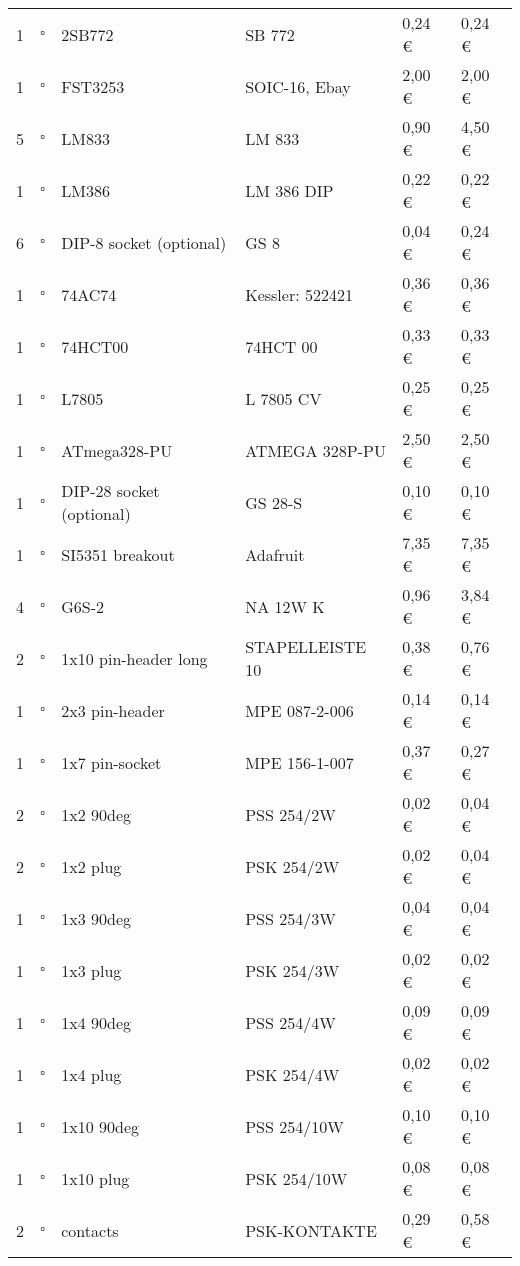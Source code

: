 \begin{longtable}{|p{}|p{}|p{}|p{}|p{}|p{}|}
1 & $\square$ & 2SB772 & SB 772 & 0,24 \euro & 0,24 \euro \\
1 & $\square$ & FST3253 & SOIC-16, Ebay & 2,00 \euro & 2,00 \euro \\
5 & $\square$ & LM833 & LM 833 & 0,90 \euro & 4,50 \euro \\
1 & $\square$ & LM386 & LM 386 DIP & 0,22 \euro & 0,22 \euro \\
6 & $\square$ & DIP-8 socket (optional) & GS 8 & 0,04 \euro & 0,24 \euro \\
1 & $\square$ & 74AC74 & Kessler: 522421 & 0,36 \euro & 0,36 \euro \\
1 & $\square$ & 74HCT00 & 74HCT 00 & 0,33 \euro & 0,33 \euro \\
1 & $\square$ & L7805 & L 7805 CV & 0,25 \euro & 0,25 \euro \\
1 & $\square$ & ATmega328-PU & ATMEGA 328P-PU & 2,50 \euro & 2,50 \euro \\
1 & $\square$ & DIP-28 socket (optional) & GS 28-S & 0,10 \euro & 0,10 \euro \\
1 & $\square$ & SI5351 breakout & Adafruit & 7,35 \euro & 7,35 \euro \\ \hline
4 & $\square$ & G6S-2 & NA 12W K & 0,96 \euro & 3,84 \euro \\ \hline
2 & $\square$ & 1x10 pin-header long & STAPELLEISTE 10 & 0,38 \euro & 0,76 \euro \\
1 & $\square$ & 2x3 pin-header & MPE 087-2-006 & 0,14 \euro & 0,14 \euro \\
1 & $\square$ & 1x7 pin-socket & MPE 156-1-007 & 0,37 \euro & 0,27 \euro \\
2 & $\square$ & 1x2 90deg & PSS 254/2W & 0,02 \euro & 0,04 \euro \\
2 & $\square$ & 1x2 plug & PSK 254/2W & 0,02 \euro & 0,04 \euro \\
1 & $\square$ & 1x3 90deg & PSS 254/3W & 0,04 \euro & 0,04 \euro \\
1 & $\square$ & 1x3 plug & PSK 254/3W & 0,02 \euro & 0,02 \euro \\
1 & $\square$ & 1x4 90deg & PSS 254/4W & 0,09 \euro & 0,09 \euro \\
1 & $\square$ & 1x4 plug & PSK 254/4W & 0,02 \euro & 0,02 \euro \\
1 & $\square$ & 1x10 90deg & PSS 254/10W & 0,10 \euro & 0,10 \euro \\
1 & $\square$ & 1x10 plug & PSK 254/10W & 0,08 \euro & 0,08 \euro \\
2 & $\square$ & contacts & PSK-KONTAKTE & 0,29 \euro & 0,58 \euro \\

\end{longtable}
